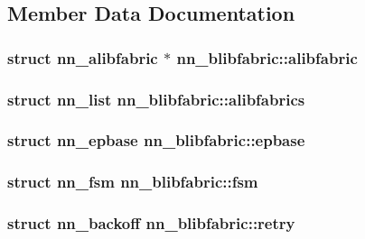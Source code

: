 \subsection{Member Data Documentation}
\subsubsection[{alibfabric}]{\setlength{\rightskip}{0pt plus 5cm}struct {\bf nn\+\_\+alibfabric} $\ast$ nn\+\_\+blibfabric\+::alibfabric}\hypertarget{structnn__blibfabric_aab27658e6d4f2fd14369456c72f9a6ed}{}\label{structnn__blibfabric_aab27658e6d4f2fd14369456c72f9a6ed}
\subsubsection[{alibfabrics}]{\setlength{\rightskip}{0pt plus 5cm}struct {\bf nn\+\_\+list} nn\+\_\+blibfabric\+::alibfabrics}\hypertarget{structnn__blibfabric_a45dd63b7b4f532b8cf89784eb5d8f12c}{}\label{structnn__blibfabric_a45dd63b7b4f532b8cf89784eb5d8f12c}
\subsubsection[{epbase}]{\setlength{\rightskip}{0pt plus 5cm}struct {\bf nn\+\_\+epbase} nn\+\_\+blibfabric\+::epbase}\hypertarget{structnn__blibfabric_a62a7b18e4d3c4e19d90bbaac7aab58e0}{}\label{structnn__blibfabric_a62a7b18e4d3c4e19d90bbaac7aab58e0}
\subsubsection[{fsm}]{\setlength{\rightskip}{0pt plus 5cm}struct {\bf nn\+\_\+fsm} nn\+\_\+blibfabric\+::fsm}\hypertarget{structnn__blibfabric_ac4da7c0cbcb8000dd0bdf92a5f250483}{}\label{structnn__blibfabric_ac4da7c0cbcb8000dd0bdf92a5f250483}
\subsubsection[{retry}]{\setlength{\rightskip}{0pt plus 5cm}struct {\bf nn\+\_\+backoff} nn\+\_\+blibfabric\+::retry}\hypertarget{structnn__blibfabric_a6318655e10f61b8d295d6d97133e2380}{}\label{structnn__blibfabric_a6318655e10f61b8d295d6d97133e2380}
